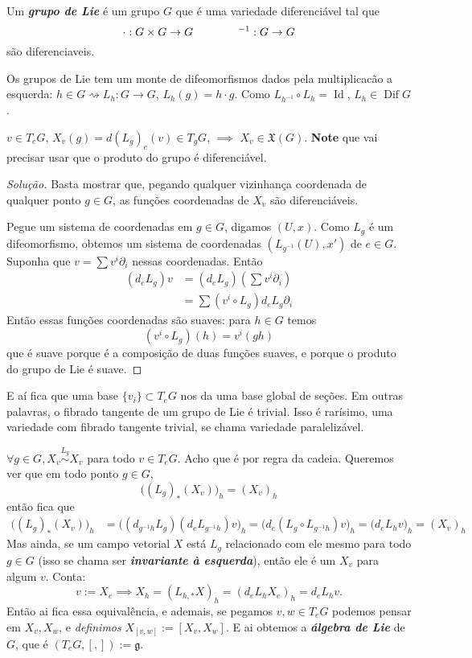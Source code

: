 \begin{defn}\leavevmode
Um \textit{\textbf{grupo de Lie}} é um grupo \(G\) que é uma variedade diferenciável tal que
\[\cdot :G \times G \to G \qquad \qquad \leavevmode^{-1}:G \to G\]
são diferenciaveis.
\end{defn}

Os grupos de Lie tem um monte de difeomorfismos dados pela multiplicacão a esquerda: \(h \in G \rightsquigarrow L_h:G \to G\), \(L_h(g)=h\cdot g\). Como \(L_{h^{-1}}\circ L_h=\operatorname{Id}\), \(L_h \in \operatorname{Dif}G\).

\begin{exercise}\leavevmode
\(v \in T_eG\), \(X_v(g)=d(L_g)_e(v) \in T_gG\), \(\implies\) \(X_v \in \mathfrak{X}(G)\). \textbf{Note} que vai precisar usar que o produto do grupo é diferenciável.
\end{exercise}

\begin{proof}[Solução]\leavevmode
Basta mostrar que, pegando qualquer vizinhança coordenada de qualquer ponto \(g \in G\), as funções coordenadas de \(X_v\) são diferenciáveis.

Pegue um sistema de coordenadas em  \(g \in G\), digamos \((U,x)\). Como  \(L_g\) é um difeomorfismo, obtemos um sistema de coordenadas \((L_{g^{-1}}(U),x')\) de \(e \in G\). Suponha que \(v=\sum v^i\partial_i\) nessas coordenadas. Então
\begin{align*}
	(d_eL_g)v&=(d_eL_g)\left(\sum v^i\partial_i\right) \\
	&=\sum (v^i \circ L_g)d_eL_g\partial_i
\end{align*}
Então essas funções coordenadas são suaves: para \(h \in G\) temos
\[(v^i \circ L_g)(h)=v^i(gh)\]
que é suave porque é a composição de duas funções suaves, e porque o produto do grupo de Lie é suave.
\end{proof}
E aí fica que uma base \(\{v_i\}\subset T_eG\) nos da uma base global de seções. Em outras palavras, o fibrado tangente de um grupo de Lie é trivial. Isso é rarísimo, uma variedade com fibrado tangente trivial, se chama variedade paralelizável.

\begin{remark}\leavevmode
\(\forall g \in G, X_v \overset{L_g}{\sim}X_v\) para todo \(v \in T_eG\). Acho que é por regra da cadeia. Queremos ver
que em todo ponto \(g \in G\), \[\Big((L_g)_*(X_v)\Big)_h=(X_v)_h\]
então fica que
\begin{align*}
\Big((L_g)_*(X_v)\Big)_h&=\Big((d_{g^{-1}h}L_g)(d_eL_{g^{-1}h})v\Big)_h=\Big(d_e(L_g\circ L_{g^{-1}h})v\Big)_h=\Big(d_eL_{h}v\Big)_h=(X_v)_h
\end{align*}
Mas ainda, se um campo vetorial \(X\) está \(L_g\) relacionado com ele mesmo para todo \(g \in G\) (isso se chama ser \textit{\textbf{invariante à esquerda}}), então ele é um \(X_v\) para algum \(v\). Conta:
\[v:=X_e \implies X_h=(L_{h,*}X)_h=(d_eL_{h}X_e)_h=d_eL_hv.\]
Então ai fica essa equivalência, e ademais, se pegamos \(v,w \in T_eG\) podemos pensar em \(X_v,X_w\), e \textit{definimos} \(X_{[v,w]}:=[X_v,X_w]\). E ai obtemos a \textit{\textbf{álgebra de Lie}} de \(G\), que é \((T_eG,[,]):=\mathfrak{g}\).
\end{remark}


